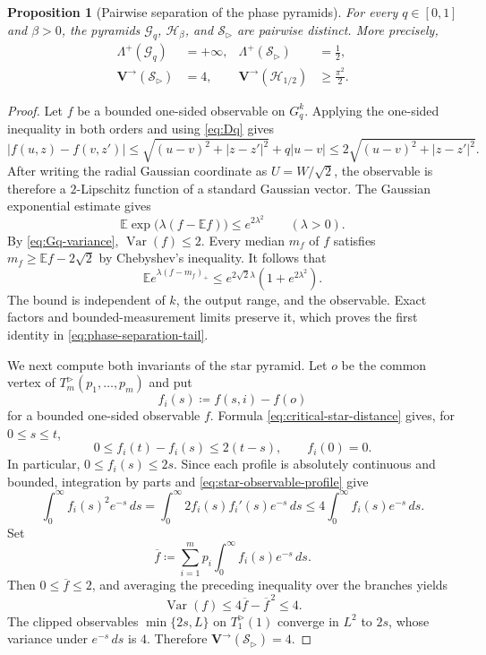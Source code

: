 \documentclass[10pt,a4paper]{amsart}
\numberwithin{equation}{section}
\newtheorem{proposition}[theorem]{Proposition}
\newcommand{\Var}{\operatorname{Var}}
\begin{document}
\begin{proposition}[Pairwise separation of the phase pyramids]
\label{prop:phase-pyramid-separation}
For every $q\in[0,1]$ and $\beta>0$, the pyramids
$\mathcal G_q$, $\mathcal H_\beta$, and $\mathcal S_{\rhd}$ are pairwise
distinct.  More precisely,
\begin{align}
 \Lambda^+(\mathcal G_q)&=+\infty,
 &\Lambda^+(\mathcal S_{\rhd})&=\frac12,
 \label{eq:phase-separation-tail}\\
 \mathbf{V}^{\to}(\mathcal S_{\rhd})&=4,
 &\mathbf{V}^{\to}(\mathcal H_{1/2})&\ge\frac{\pi^2}{2}.
 \label{eq:phase-separation-variance}
\end{align}
\end{proposition}

\begin{proof}
Let $f$ be a bounded one-sided observable on $G_q^k$.  Applying the
one-sided inequality in both orders and using \eqref{eq:Dq} gives
\[ |f(u,z)-f(v,z')| \le\sqrt{(u-v)^2+|z-z'|^2}+q|u-v| \le2\sqrt{(u-v)^2+|z-z'|^2}. \]
After writing the radial Gaussian coordinate as $U=W/\sqrt2$, the observable
is therefore a $2$-Lipschitz function of a standard Gaussian vector.  The
Gaussian exponential estimate gives
\begin{equation}\label{eq:Gq-centered-exponential} \mathbb E\exp\bigl(\lambda(f-\mathbb Ef)\bigr) \le e^{2\lambda^2} \qquad(\lambda>0). \end{equation}
By \eqref{eq:Gq-variance}, $\Var(f)\le2$.  Every median $m_f$ of $f$ satisfies
$m_f\ge\mathbb Ef-2\sqrt2$ by Chebyshev's inequality.  It follows that
\[ \mathbb E e^{\lambda(f-m_f)_+} \le e^{2\sqrt2\lambda} \left(1+e^{2\lambda^2}\right). \]
The bound is independent of $k$, the output range, and the observable.
Exact factors and bounded-measurement limits preserve it, which proves the
first identity in \eqref{eq:phase-separation-tail}.

We next compute both invariants of the star pyramid.  Let $o$ be the common
vertex of $T_m^{\rhd}(p_1,\ldots,p_m)$ and put
\[ f_i(s)\coloneqq f(s,i)-f(o) \]
for a bounded one-sided observable $f$.  Formula
\eqref{eq:critical-star-distance} gives, for $0\le s\le t$,
\begin{equation}\label{eq:star-observable-profile} 0\le f_i(t)-f_i(s)\le2(t-s), \qquad f_i(0)=0. \end{equation}
In particular, $0\le f_i(s)\le2s$.  Since each profile is absolutely
continuous and bounded, integration by parts and
\eqref{eq:star-observable-profile} give
\[ \int_0^\infty f_i(s)^2e^{-s}\,ds =\int_0^\infty2f_i(s)f_i'(s)e^{-s}\,ds \le4\int_0^\infty f_i(s)e^{-s}\,ds. \]
Set
\[ \overline f\coloneqq\sum_{i=1}^mp_i\int_0^\infty f_i(s)e^{-s}\,ds. \]
Then $0\le\overline f\le2$, and averaging the preceding inequality over
the branches yields
\[ \Var(f)\le4\overline f-\overline f^{\,2}\le4. \]
The clipped observables $\min\{2s,L\}$ on $T_1^{\rhd}(1)$ converge in
$L^2$ to $2s$, whose variance under $e^{-s}\,ds$ is $4$.  Therefore
$\mathbf{V}^{\to}(\mathcal S_{\rhd})=4$.


\end{proof}
\end{document}
